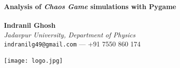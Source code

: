 \documentclass[a0,portrait]{a0poster}
\begin{document}


\begin{minipage}[b]{0.8\linewidth}
\VeryHuge \color{NavyBlue} \textbf{Analysis of \textit{Chaos Game} simulations with Pygame} \color{Black}\\ %
\Huge\textit{}\\[2.4cm] %
\huge \textbf{Indranil Ghosh}\\[0.7cm] %
\huge \textit{Jadavpur University, Department of Physics}\\[0.4cm] %
\Large \texttt{indranilg49@gmail.com} --- +91 7550 860 174\\
\end{minipage}
%
\begin{minipage}[b]{0.4\linewidth}
\texttt{[image: logo.jpg]}\\
\end{minipage}

\vspace{0.5cm} %

\end{document}
